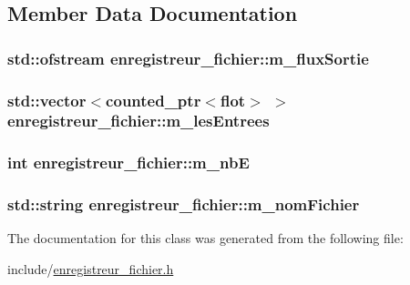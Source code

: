 \subsection{Member Data Documentation}
\hypertarget{classenregistreur__fichier_a878b033faa126b12ad6080fe1a159c70}{
\subsubsection[{m\-\_\-flux\-Sortie}]{\setlength{\rightskip}{0pt plus 5cm}std\-::ofstream enregistreur\-\_\-fichier\-::m\-\_\-flux\-Sortie\hspace{0.3cm}{\ttfamily [private]}}}\label{classenregistreur__fichier_a878b033faa126b12ad6080fe1a159c70}
\hypertarget{classenregistreur__fichier_a27e5d8ef895fc1bacf7dd20fe7532373}{
\subsubsection[{m\-\_\-les\-Entrees}]{\setlength{\rightskip}{0pt plus 5cm}std\-::vector$<${\bf counted\-\_\-ptr}$<${\bf flot}$>$ $>$ enregistreur\-\_\-fichier\-::m\-\_\-les\-Entrees\hspace{0.3cm}{\ttfamily [private]}}}\label{classenregistreur__fichier_a27e5d8ef895fc1bacf7dd20fe7532373}
\hypertarget{classenregistreur__fichier_a18b256b717938088893ac6c836079428}{
\subsubsection[{m\-\_\-nb\-E}]{\setlength{\rightskip}{0pt plus 5cm}int enregistreur\-\_\-fichier\-::m\-\_\-nb\-E\hspace{0.3cm}{\ttfamily [private]}}}\label{classenregistreur__fichier_a18b256b717938088893ac6c836079428}
\hypertarget{classenregistreur__fichier_a2112179ea9e7bba0eb1cdbd8e627d695}{
\subsubsection[{m\-\_\-nom\-Fichier}]{\setlength{\rightskip}{0pt plus 5cm}std\-::string enregistreur\-\_\-fichier\-::m\-\_\-nom\-Fichier\hspace{0.3cm}{\ttfamily [private]}}}\label{classenregistreur__fichier_a2112179ea9e7bba0eb1cdbd8e627d695}


The documentation for this class was generated from the following file\-:\begin{DoxyCompactItemize}
\item 
include/\hyperlink{enregistreur__fichier_8h}{enregistreur\-\_\-fichier.\-h}\end{DoxyCompactItemize}

